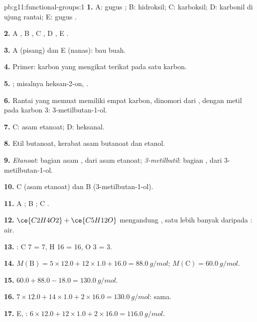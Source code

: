 \begin{solution}{pb:g11:functional-groups:1}
\textbf{1.} A: gugus ; B: hidroksil; C: karboksil; D: karbonil di
ujung rantai; E: gugus .

\textbf{2.} A , B , C , D , E .

\textbf{3.} A (pisang) dan E (nanas): bau buah.

\textbf{4.} Primer: karbon yang mengikat  terikat pada satu
karbon.

\textbf{5.} ; misalnya heksan-2-on,
.

\textbf{6.} Rantai yang memuat  memiliki empat karbon, dinomori
dari , dengan metil pada karbon 3: 3-metilbutan-1-ol.

\textbf{7.} C: asam etanoat; D: heksanal.

\textbf{8.} Etil butanoat, kerabat asam butanoat dan etanol.

\textbf{9.} \emph{Etanoat}: bagian asam , dari asam etanoat;
\emph{3-metilbutil}: bagian , dari 3-metilbutan-1-ol.

\textbf{10.} C (asam etanoat) dan B (3-metilbutan-1-ol).

\textbf{11.} A ; B ; C .

\textbf{12.} $\ce{C2H4O2} + \ce{C5H12O}$ mengandung , satu
 lebih banyak daripada : air.

\textbf{13.} : C 7 = 7, H 16 = 16,
O 3 = 3.

\textbf{14.} $M(\text{B}) = 5 \times 12.0 + 12 \times 1.0 + 16.0 =
\qty{88.0}{g/mol}$; $M(\text{C}) = \qty{60.0}{g/mol}$.

\textbf{15.} $60.0 + 88.0 - 18.0 = \qty{130.0}{g/mol}$.

\textbf{16.} $7 \times 12.0 + 14 \times 1.0 + 2 \times 16.0 =
\qty{130.0}{g/mol}$: sama.

\textbf{17.} E, : $6 \times 12.0 + 12 \times 1.0 + 2 \times
16.0 = \qty{116.0}{g/mol}$.


\end{solution}
